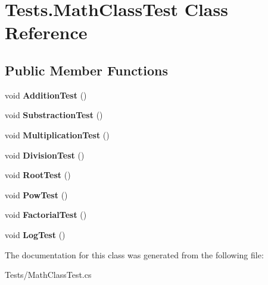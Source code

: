 \hypertarget{class_tests_1_1_math_class_test}{}\section{Tests.\+Math\+Class\+Test Class Reference}
\label{class_tests_1_1_math_class_test}
\subsection*{Public Member Functions}
\begin{DoxyCompactItemize}
\item 
\mbox{\label{class_tests_1_1_math_class_test_ad42114e0a146184e4b0d1aade1a48258}} 
void {\bfseries Addition\+Test} ()
\item 
\mbox{\label{class_tests_1_1_math_class_test_a6492bba2eff2acc3def6a2671b6bf2be}} 
void {\bfseries Substraction\+Test} ()
\item 
\mbox{\label{class_tests_1_1_math_class_test_ab273b9214c7f5eae931bf6fd23a84b9b}} 
void {\bfseries Multiplication\+Test} ()
\item 
\mbox{\label{class_tests_1_1_math_class_test_a375625ccfef1561e161fab2ec006e13f}} 
void {\bfseries Division\+Test} ()
\item 
\mbox{\label{class_tests_1_1_math_class_test_a34dc6e8a41cd8c78c9bd03fe4946a907}} 
void {\bfseries Root\+Test} ()
\item 
\mbox{\label{class_tests_1_1_math_class_test_aa8776677350dc1c80a9e7f596d51d410}} 
void {\bfseries Pow\+Test} ()
\item 
\mbox{\label{class_tests_1_1_math_class_test_ad45ea7f52cc56e2732ff637a5acd9bf2}} 
void {\bfseries Factorial\+Test} ()
\item 
\mbox{\label{class_tests_1_1_math_class_test_a2ccd9ca6bd31f1d5be2d4185fe94114c}} 
void {\bfseries Log\+Test} ()
\end{DoxyCompactItemize}


The documentation for this class was generated from the following file\+:\begin{DoxyCompactItemize}
\item 
Tests/Math\+Class\+Test.\+cs\end{DoxyCompactItemize}
